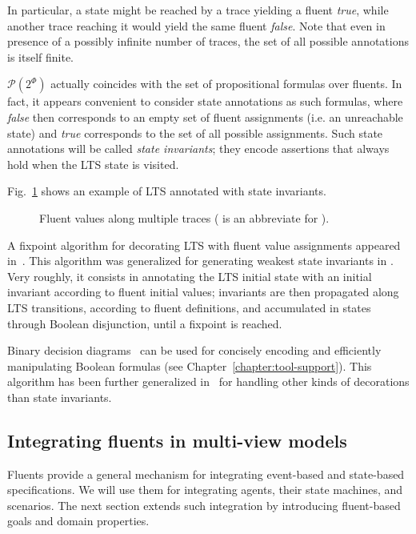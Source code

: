 In particular, a state might be reached by a trace yielding a fluent \emph{true}, while another trace reaching it would yield the same fluent \emph{false}. Note that even in presence of a possibly infinite number of traces, the set of all possible annotations is itself finite. 

$\mathcal{P}(2^\Phi)$ actually coincides with the set of propositional formulas over fluents. In fact, it appears convenient to consider state annotations as such formulas, where \emph{false} then corresponds to an empty set of fluent assignments (i.e. an unreachable state) and \emph{true} corresponds to the set of all possible assignments. Such state annotations will be called \emph{state invariants}; they encode assertions that always hold when the LTS state is visited. 

Fig.~\ref{image:fluent-values-along-multiple-traces} shows an example of LTS annotated with state invariants.

\begin{figure}[H]\centering
{}
\caption{Fluent values along multiple traces ( is an abbreviate for ).\label{image:fluent-values-along-multiple-traces}}
\end{figure}

A fixpoint algorithm for decorating LTS with fluent value assignments appeared in~\cite{Damas:2005}. This algorithm was generalized for generating weakest state invariants in \cite{Damas:2009}. Very roughly, it consists in annotating the LTS initial state with an initial invariant according to fluent initial values; invariants are then propagated along LTS transitions, according to fluent definitions, and accumulated in states through Boolean disjunction, until a fixpoint is reached. 

Binary decision diagrams~\cite{Bryant:1986} can be used for concisely encoding and efficiently manipulating Boolean formulas (see Chapter~\ref{chapter:tool-support}). This algorithm has been further generalized in~\cite{Damas:2011} for handling other kinds of decorations than state invariants.

\subsection{Integrating fluents in multi-view models}

Fluents provide a general mechanism for integrating event-based and state-based specifications. We will use them for integrating agents, their state machines, and scenarios. The next section extends such integration by introducing fluent-based goals and domain properties.

